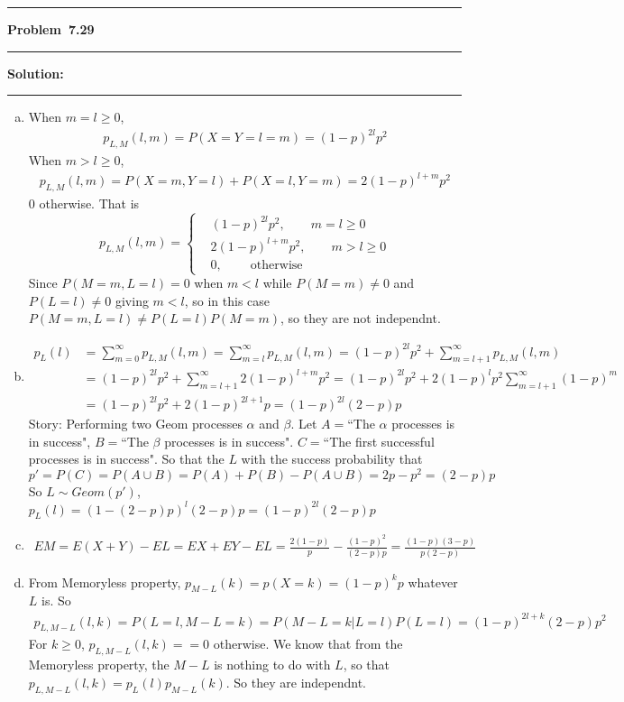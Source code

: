\documentclass[10.5pt]{article}
\newcommand\question[1]{\vspace{.2in}\hrule\vspace{0.04in}\textbf{Problem\ #1}\vspace{.4em}\hrule\vspace{.10in}}
\newcommand\Solution{\vspace{.3in}\textbf{Solution:}\vspace{.5em}\hrule\vspace{.08in}\par}
\begin{document}
\question{7.29}
\Solution{}
\begin{enumerate}[(a)]
	\item When $m = l \geqslant 0$, \begin{align*}
		p_{L, M}(l, m) = P(X = Y = l = m) = (1-p)^{2l}p^2
	\end{align*}
	When $m > l \geqslant 0$, \begin{align*}
		p_{L, M}(l, m) = P(X = m, Y = l) + P(X = l, Y = m) = 2(1-p)^{l+m}p^2
	\end{align*}
	$0$ otherwise. 
	That is \begin{equation*}
		p_{L, M}(l, m) =\begin{cases}
			&(1-p)^{2l}p^2,\qquad m = l \geqslant 0\\[6pt]
			&2(1-p)^{l+m}p^2,\qquad m > l \geqslant 0\\[6pt]
			&0,\qquad\ \text{otherwise}
		\end{cases}
	\end{equation*}
	Since $P(M = m, L = l) = 0$ when $m < l$ while $P(M = m)\neq 0$ and $P(L = l)\neq 0$ giving $m<l$, so in this case $P(M = m, L = l)\neq P(L = l)P(M = m)$, so they are not independnt.
	\item \begin{align*}
		p_L(l) &= \sum_{m = 0}^{\infty}p_{L, M}(l, m) = \sum_{m = l}^{\infty}p_{L, M}(l, m) = (1-p)^{2l}p^2+\sum_{m = l+1}^{\infty}p_{L, M}(l, m)\\[6pt]
		&=(1-p)^{2l}p^2+\sum_{m = l+1}^{\infty}2(1-p)^{l+m}p^2 = (1-p)^{2l}p^2+2(1-p)^{l}p^2\sum_{m = l+1}^{\infty}(1-p)^{m}\\[6pt]
		&=(1-p)^{2l}p^2+2(1-p)^{2l+1}p = (1 - p)^{2l}(2-p)p
	\end{align*}
	Story: Performing two Geom processes $\alpha$ and $\beta$. Let $A = $``The $\alpha$ processes is in success", $B = $``The $\beta$ processes is in success".
	$C = $``The first successful processes is in success". So that the $L$ with the success probability that $$p' = P(C) = P(A\cup B) = P(A)+P(B) - P(A\cup B) = 2p - p^2 = (2 - p)p$$
	So $L\sim Geom(p')$, $p_L(l) = (1 - (2 - p)p)^l(2 - p)p = (1 - p)^{2l}(2-p)p$\vspace{1cm}
	\item \begin{align*}
		EM = E(X+Y) - EL = EX + EY - EL = \frac{2(1-p)}{p} - \frac{(1-p)^2}{(2-p)p} = \frac{(1-p)(3-p)}{p(2-p)}
	\end{align*}\vspace{1cm}
	\item From Memoryless property, $p_{M-L}(k) = p(X = k) = (1-p)^kp$ whatever $L$ is. So
	\begin{align*}
		p_{L, M-L}(l, k) = P(L = l, M - L = k) = P(M-L = k|L = l)P(L = l) = (1-p)^{2l+k}(2-p)p^2
	\end{align*}
	For $k\geqslant 0$, $p_{L, M-L}(l, k) = = 0$ otherwise.
	We know that from the Memoryless property, the $M - L$ is nothing to do with $L$, so that $p_{L, M-L}(l, k) = p_L(l)p_{M-L}(k)$. So they are independnt.
\end{enumerate}
\end{document}
